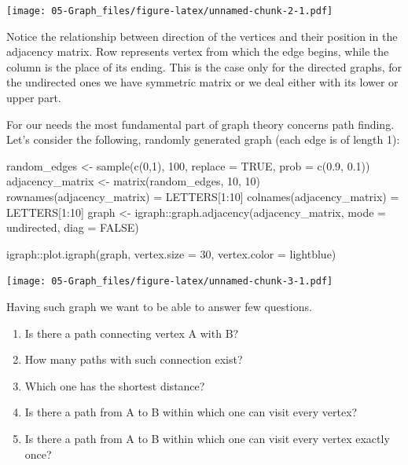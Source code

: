 \documentclass[
]{book}
\newenvironment{Shaded}{\begin{snugshade}}{\end{snugshade}}
\newcommand{\AttributeTok}[1]{\textcolor[rgb]{0.77,0.63,0.00}{#1}}
\newcommand{\ConstantTok}[1]{\textcolor[rgb]{0.00,0.00,0.00}{#1}}
\newcommand{\DecValTok}[1]{\textcolor[rgb]{0.00,0.00,0.81}{#1}}
\newcommand{\FloatTok}[1]{\textcolor[rgb]{0.00,0.00,0.81}{#1}}
\newcommand{\FunctionTok}[1]{\textcolor[rgb]{0.00,0.00,0.00}{#1}}
\newcommand{\NormalTok}[1]{#1}
\newcommand{\OtherTok}[1]{\textcolor[rgb]{0.56,0.35,0.01}{#1}}
\newcommand{\SpecialCharTok}[1]{\textcolor[rgb]{0.00,0.00,0.00}{#1}}
\newcommand{\StringTok}[1]{\textcolor[rgb]{0.31,0.60,0.02}{#1}}
\providecommand{\tightlist}{%
  \setlength{\itemsep}{0pt}\setlength{\parskip}{0pt}}
\begin{document}
\texttt{[image: 05-Graph\_files/figure-latex/unnamed-chunk-2-1.pdf]}

Notice the relationship between direction of the vertices and their position in the adjacency matrix. Row represents vertex from which the edge begins, while the column is the place of its ending. This is the case only for the directed graphs, for the undirected ones we have symmetric matrix or we deal either with its lower or upper part.

For our needs the most fundamental part of graph theory concerns path finding. Let's consider the following, randomly generated graph (each edge is of length 1):

\begin{Shaded}
\begin{Highlighting}[]
\NormalTok{random\_edges }\OtherTok{\textless{}{-}} \FunctionTok{sample}\NormalTok{(}\FunctionTok{c}\NormalTok{(}\DecValTok{0}\NormalTok{,}\DecValTok{1}\NormalTok{), }\DecValTok{100}\NormalTok{, }\AttributeTok{replace =} \ConstantTok{TRUE}\NormalTok{, }\AttributeTok{prob =} \FunctionTok{c}\NormalTok{(}\FloatTok{0.9}\NormalTok{, }\FloatTok{0.1}\NormalTok{))}
\NormalTok{adjacency\_matrix }\OtherTok{\textless{}{-}} \FunctionTok{matrix}\NormalTok{(random\_edges, }\DecValTok{10}\NormalTok{, }\DecValTok{10}\NormalTok{)}
\FunctionTok{rownames}\NormalTok{(adjacency\_matrix) }\OtherTok{=}\NormalTok{ LETTERS[}\DecValTok{1}\SpecialCharTok{:}\DecValTok{10}\NormalTok{]}
\FunctionTok{colnames}\NormalTok{(adjacency\_matrix) }\OtherTok{=}\NormalTok{ LETTERS[}\DecValTok{1}\SpecialCharTok{:}\DecValTok{10}\NormalTok{]}
\NormalTok{graph }\OtherTok{\textless{}{-}}\NormalTok{ igraph}\SpecialCharTok{::}\FunctionTok{graph.adjacency}\NormalTok{(adjacency\_matrix, }\AttributeTok{mode =} \StringTok{\textquotesingle{}undirected\textquotesingle{}}\NormalTok{, }
                                 \AttributeTok{diag =} \ConstantTok{FALSE}\NormalTok{)}

\NormalTok{igraph}\SpecialCharTok{::}\FunctionTok{plot.igraph}\NormalTok{(graph, }\AttributeTok{vertex.size =} \DecValTok{30}\NormalTok{, }\AttributeTok{vertex.color =} \StringTok{\textquotesingle{}lightblue\textquotesingle{}}\NormalTok{)}
\end{Highlighting}
\end{Shaded}

\texttt{[image: 05-Graph\_files/figure-latex/unnamed-chunk-3-1.pdf]}

Having such graph we want to be able to answer few questions.

\begin{enumerate}
\def\labelenumi{\arabic{enumi}.}
\tightlist
\item
  Is there a path connecting vertex A with B?
\item
  How many paths with such connection exist?
\item
  Which one has the shortest distance?
\item
  Is there a path from A to B within which one can visit every vertex?
\item
  Is there a path from A to B within which one can visit every vertex exactly once?
\end{enumerate}
\end{document}
